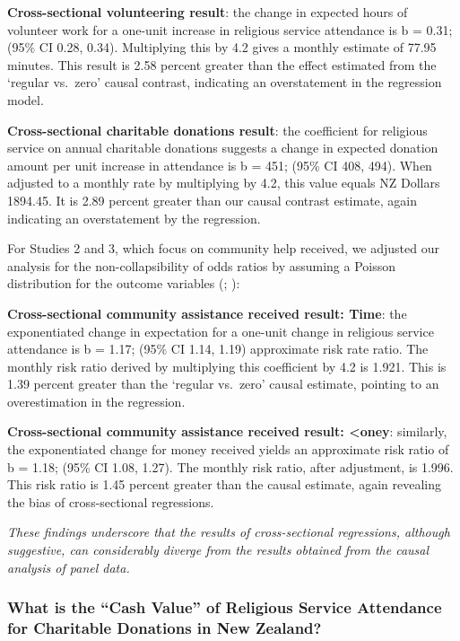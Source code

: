 \documentclass[
  single column]{article}
\begin{document}
\textbf{Cross-sectional volunteering result}: the change in expected
hours of volunteer work for a one-unit increase in religious service
attendance is b = 0.31; (95\% CI 0.28, 0.34). Multiplying this by 4.2
gives a monthly estimate of 77.95 minutes. This result is 2.58 percent
greater than the effect estimated from the `regular vs.~zero' causal
contrast, indicating an overstatement in the regression model.

\textbf{Cross-sectional charitable donations result}: the coefficient
for religious service on annual charitable donations suggests a change
in expected donation amount per unit increase in attendance is b = 451;
(95\% CI 408, 494). When adjusted to a monthly rate by multiplying by
4.2, this value equals NZ Dollars 1894.45. It is 2.89 percent greater
than our causal contrast estimate, again indicating an overstatement by
the regression.

For Studies 2 and 3, which focus on community help received, we adjusted
our analysis for the non-collapsibility of odds ratios by assuming a
Poisson distribution for the outcome variables
(; ):

\textbf{Cross-sectional community assistance received result: Time}: the
exponentiated change in expectation for a one-unit change in religious
service attendance is b = 1.17; (95\% CI 1.14, 1.19) approximate risk
rate ratio. The monthly risk ratio derived by multiplying this
coefficient by 4.2 is 1.921. This is 1.39 percent greater than the
`regular vs.~zero' causal estimate, pointing to an overestimation in the
regression.

\textbf{Cross-sectional community assistance received result:
\textless oney}: similarly, the exponentiated change for money received
yields an approximate risk ratio of b = 1.18; (95\% CI 1.08, 1.27). The
monthly risk ratio, after adjustment, is 1.996. This risk ratio is 1.45
percent greater than the causal estimate, again revealing the bias of
cross-sectional regressions.

\emph{These findings underscore that the results of cross-sectional
regressions, although suggestive, can considerably diverge from the
results obtained from the causal analysis of panel data.}

\newpage{}

\subsubsection{What is the ``Cash Value'' of Religious Service
Attendance for Charitable Donations in New
Zealand?}\label{what-is-the-cash-value-of-religious-service-attendance-for-charitable-donations-in-new-zealand}
\end{document}
